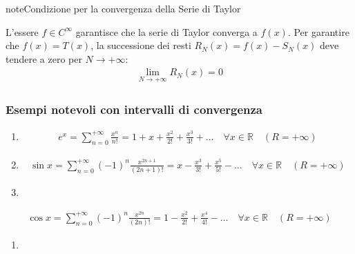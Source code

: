 \documentclass[letterpaper,10pt,italian]{jupyterBook}
\begin{document}
\begin{sphinxadmonition}{note}{Condizione per la convergenza della Serie di Taylor}

\sphinxAtStartPar
{} L’essere \(f \in C^\infty\)  garantisce che la serie di Taylor converga a \(f(x)\).
Per garantire che \(f(x) = T(x)\), la successione dei resti \(R_N(x) = f(x) - S_N(x)\) deve tendere a zero per \(N \to +\infty\):
\begin{equation*}
\begin{split}\lim_{N \to +\infty} R_N(x) = 0\end{split}
\end{equation*}\end{sphinxadmonition}


\subsubsection{Esempi notevoli con intervalli di convergenza}
\label{\detokenize{ch/series/series-functions-real:esempi-notevoli-con-intervalli-di-convergenza}}\begin{enumerate}
%
\item {} 
\sphinxAtStartPar
{}
\begin{equation*}
\begin{split}e^x = \sum_{n=0}^{+\infty} \frac{x^n}{n!} = 1 + x + \frac{x^2}{2!} + \frac{x^3}{3!} + \dots \quad \forall x \in \mathbb{R} \quad (R = +\infty)\end{split}
\end{equation*}
\item {} 
\sphinxAtStartPar
{}
\begin{equation*}
\begin{split}\sin x = \sum_{n=0}^{+\infty} (-1)^n \frac{x^{2n+1}}{(2n+1)!} = x - \frac{x^3}{3!} + \frac{x^5}{5!} - \dots \quad \forall x \in \mathbb{R} \quad (R = +\infty)\end{split}
\end{equation*}
\item {} 
\sphinxAtStartPar
{}

\end{enumerate}
\begin{equation*}
\begin{split}\cos x = \sum_{n=0}^{+\infty} (-1)^n \frac{x^{2n}}{(2n)!} = 1 - \frac{x^2}{2!} + \frac{x^4}{4!} - \dots \quad \forall x \in \mathbb{R} \quad (R = +\infty)\end{split}
\end{equation*}\begin{enumerate}
%
\setcounter{enumi}{3}
\item {} 
\sphinxAtStartPar
{}

\end{enumerate}
\end{document}
